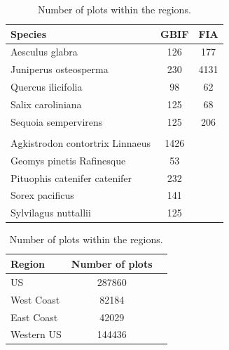 \begin{table}
    \begin{minipage}{.5\linewidth}
      
      \centering
        \begin{tabular}{lcc}
            \toprule
            Species & GBIF & FIA \\
            \midrule
Aesculus glabra & 126 & 177 \\
Juniperus osteosperma & 230 & 4131\\
Quercus ilicifolia & 98 & 62 \\
Salix caroliniana &  125 & 68  \\ 
Sequoia sempervirens & 125 & 206 \\
\\
Agkistrodon contortrix Linnaeus & 1426 & \\
Geomys pinetis Rafinesque & 53 & \\
Pituophis catenifer catenifer & 232 & \\
Sorex pacificus  & 141 & \\
Sylvilagus nuttallii & 125 & \\
            \bottomrule
        \end{tabular}
        \caption{\label{table:NrObs}Number of occurrence observations.}
    \end{minipage}%
    \qquad
    \begin{minipage}{.5\linewidth}
      \centering
        \begin{tabular}{lcc}
        \toprule
        Region & Number of plots \\
        \midrule
            US & 287860 \\
            West Coast &  82184 \\
            East Coast &  42029 \\
            Western US &  144436 \\
            \bottomrule
        \end{tabular}
        \caption{\label{table:PlotsRegion}Number of plots within the regions.}
    \end{minipage} 
\end{table}




